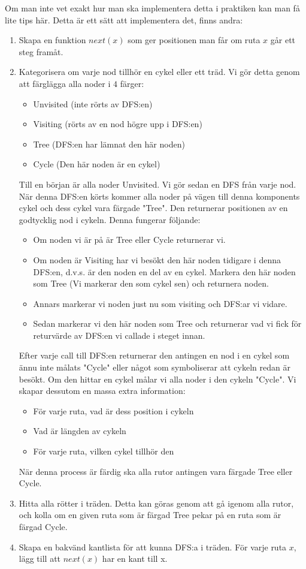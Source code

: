 \documentclass{article}
\begin{document}
Om man inte vet exakt hur man ska implementera detta i praktiken kan man få lite tips här. Detta är ett sätt att implementera det, finns andra:
\begin{enumerate}
    \item Skapa en funktion $next(x)$ som ger positionen man får om ruta $x$ går ett steg framåt.
    \item Kategorisera om varje nod tillhör en cykel eller ett träd. Vi gör detta genom att färglägga alla noder i $4$ färger:
        \begin{itemize}
              \item Unvisited (inte rörts av DFS:en)
              \item Visiting  (rörts av en nod högre upp i DFS:en)
              \item Tree      (DFS:en har lämnat den här noden)
              \item Cycle     (Den här noden är en cykel)
        \end{itemize}
    Till en början är alla noder Unvisited. Vi gör sedan en DFS från varje nod. När denna DFS:en körts kommer alla noder på vägen till denna komponents cykel och dess cykel vara färgade "Tree". Den returnerar positionen av en godtycklig nod i cykeln. Denna fungerar följande:
        \begin{itemize}
            \item Om noden vi är på är Tree eller Cycle returnerar vi. 
            \item Om noden är Visiting har vi besökt den här noden tidigare i denna DFS:en, d.v.s. är den noden en del av en cykel. Markera den här noden som Tree (Vi markerar den som cykel sen) och returnera noden.
            \item Annars markerar vi noden just nu som visiting och DFS:ar vi vidare.
            \item Sedan markerar vi den här noden som Tree och returnerar vad vi fick för returvärde av DFS:en vi callade i steget innan.
        \end{itemize}
        Efter varje call till DFS:en returnerar den antingen en nod i en cykel som ännu inte målats "Cycle" eller något som symboliserar att cykeln redan är besökt. Om den hittar en cykel målar vi alla noder i den cykeln "Cycle". Vi skapar dessutom en massa extra information:
        \begin{itemize}
            \item För varje ruta, vad är dess position i cykeln
            \item Vad är längden av cykeln
            \item För varje ruta, vilken cykel tillhör den
        \end{itemize}
        När denna process är färdig ska alla rutor antingen vara färgade Tree eller Cycle.
    \item Hitta alla rötter i träden. Detta kan göras genom att gå igenom alla rutor, och kolla om en given ruta som är färgad Tree pekar på en ruta som är färgad Cycle. 
    \item Skapa en bakvänd kantlista för att kunna DFS:a i träden. För varje ruta $x$, lägg till att $next(x)$ har en kant till x. 
    

\end{enumerate}
\end{document}
